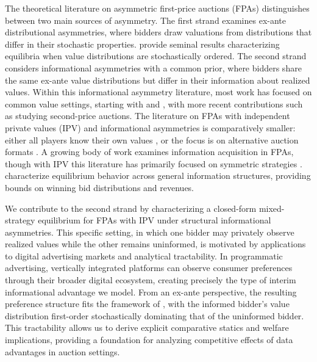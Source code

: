 \noindent The theoretical literature on asymmetric first-price auctions (FPAs) distinguishes between two main sources of asymmetry. The first strand examines ex-ante distributional asymmetries, where bidders draw valuations from distributions that differ in their stochastic properties. \textcite{maskinAsymmetricAuctions2000} provide seminal results characterizing equilibria when value distributions are stochastically ordered. The second strand considers informational asymmetries with a common prior, where bidders share the same ex-ante value distributions but differ in their information about realized values. Within this informational asymmetry literature, most work has focused on common value settings, starting with \textcite{wilsonCompetitiveBiddingAsymmetric1967} and \textcite{engelbrecht-wiggansCompetitiveBiddingProprietary1983}, with more recent contributions such as \textcite{abrahamPeachesLemonsCookies2020} studying second-price auctions. The literature on FPAs with independent private values (IPV) and informational asymmetries is comparatively smaller: either all players know their own values \parencite{martinez-pardinaFirstpriceAuctionsWhere2006}, or the focus is on alternative auction formats \parencite{compteWaitandSeeOptionAscending2004, miettinenInformationAcquisitionDutch2013}. A growing body of work examines information acquisition in FPAs, though with IPV this literature has primarily focused on symmetric strategies \parencite{hauschPrivateValuesAuctions1991, shiOptimalAuctionsInformation2012}. \textcite{bergemannFirstPriceAuctionsGeneral2017} characterize equilibrium behavior across general information structures, providing bounds on winning bid distributions and revenues.\par

\noindent We contribute to the second strand by characterizing a closed-form mixed-strategy equilibrium for FPAs with IPV under structural informational asymmetries. This specific setting, in which one bidder may privately observe realized values while the other remains uninformed, is motivated by applications to digital advertising markets and analytical tractability. In programmatic advertising, vertically integrated platforms can observe consumer preferences through their broader digital ecosystem, creating precisely the type of interim informational advantage we model. From an ex-ante perspective, the resulting preference structure fits the framework of \textcite{maskinAsymmetricAuctions2000}, with the informed bidder's value distribution first-order stochastically dominating that of the uninformed bidder. This tractability allows us to derive explicit comparative statics and welfare implications, providing a foundation for analyzing competitive effects of data advantages in auction settings.\par

